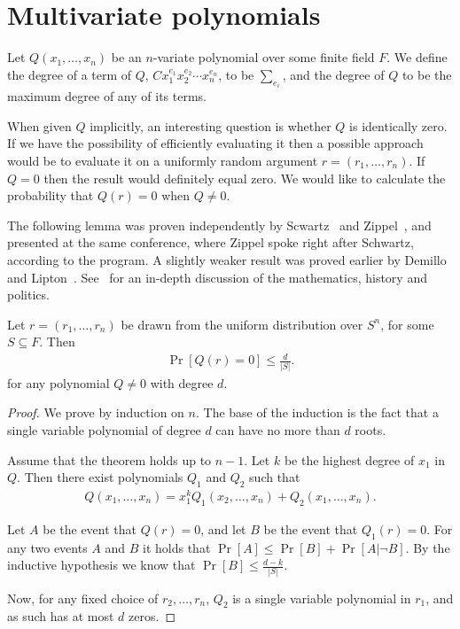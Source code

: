 \documentclass{article}
\begin{document}
\section{Multivariate polynomials}
Let $Q({x_1, \ldots, x_n})$ be an $n$-variate polynomial over some
finite field $F$. We define the degree of a term of $Q$,
$Cx_1^{e_1}x_2^{e_2} \cdots x_n^{e_n}$, to be $\sum_{e_i}$, and the
degree of $Q$ to be the maximum degree of any of its terms.

When given $Q$ implicitly, an interesting question is whether $Q$ is
identically zero. If we have the possibility of efficiently evaluating
it then a possible approach would be to evaluate it on a uniformly
random argument $r = (r_1, \ldots, r_n)$. If $Q = 0$ then the result
would definitely equal zero. We would like to calculate the
probability that $Q(r) = 0$ when $Q \neq 0$.

The following lemma was proven independently by
Scwartz~\cite{Schwartz:1980} and Zippel~\cite{Zippel:1979}, and
presented at the same conference, where Zippel spoke right after
Schwartz, according to the program. A slightly weaker result was
proved earlier by Demillo and
Lipton~\cite{DemilloLipton:1978}. See~\cite{LiptonBlog} for an
in-depth discussion of the mathematics, history and politics.

\begin{lemma}
  Let $r = (r_1, \ldots, r_n)$ be drawn from the uniform distribution
  over $S^n$, for some $S \subseteq F$. Then
  \begin{align*}
    \Pr[Q(r) = 0] \leq \frac{d}{|S|}.
  \end{align*}
  for any polynomial $Q \neq 0$ with degree $d$.
\end{lemma}
\begin{proof}
  We prove by induction on $n$. The base of the induction is the fact
  that a single variable polynomial of degree $d$ can have no more
  than $d$ roots.

  Assume that the theorem holds up to $n-1$. Let $k$ be the highest
  degree of $x_1$ in $Q$. Then there exist polynomials $Q_1$ and $Q_2$
  such that
  \begin{align*}
    Q(x_1, \ldots, x_n) = x_1^kQ_1(x_2, \ldots, x_n) + Q_2(x_1, \ldots, x_n).
  \end{align*}

  Let $A$ be the event that $Q(r) = 0$, and let $B$ be the event that
  $Q_1(r) = 0$. For any two events $A$ and $B$ it holds that $\Pr[A]
  \leq \Pr[B] + \Pr[A| \neg B]$. By the inductive hypothesis we know
  that $\Pr[B] \leq \frac{d-k}{|S|}$.

  Now, for any fixed choice of $r_2, \ldots, r_n$, $Q_2$ is a
  single variable polynomial in $r_1$, and as such has at most $d$ zeros.
\end{proof}
\end{document}
